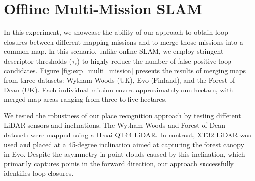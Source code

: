 \section{Offline Multi-Mission SLAM} 
\label{sec:offline_multi_mission}
In this experiment, we showcase the ability of our approach to obtain loop closures between different mapping missions and to merge those missions into a common map. In this scenario, unlike online-SLAM, we employ stringent descriptor thresholds ($\tau_{s}$) to highly reduce the number of false positive loop candidates. 
Figure \ref{fig:exp_multi_mission} presents the results of merging maps from three datasets: Wytham Woods (UK), Evo (Finland), and the Forest of Dean (UK). Each individual mission covers approximately one hectare, with merged map areas ranging from three to five hectares.

We tested the robustness of our place recognition approach by testing different LiDAR sensors and inclinations. The Wytham Woods and Forest of Dean datasets were mapped using a Hesai QT64 LiDAR. In contrast, XT32 LiDAR was used and placed at a 45-degree inclination aimed at capturing the forest canopy in Evo. Despite the asymmetry in point clouds caused by this inclination, which primarily captures points in the forward direction, our approach successfully identifies loop closures.





